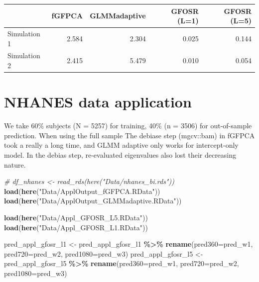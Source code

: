 \documentclass[
]{article}
\newenvironment{Shaded}{\begin{snugshade}}{\end{snugshade}}
\newcommand{\AttributeTok}[1]{\textcolor[rgb]{0.13,0.29,0.53}{#1}}
\newcommand{\CommentTok}[1]{\textcolor[rgb]{0.56,0.35,0.01}{\textit{#1}}}
\newcommand{\FunctionTok}[1]{\textcolor[rgb]{0.13,0.29,0.53}{\textbf{#1}}}
\newcommand{\NormalTok}[1]{#1}
\newcommand{\OtherTok}[1]{\textcolor[rgb]{0.56,0.35,0.01}{#1}}
\newcommand{\SpecialCharTok}[1]{\textcolor[rgb]{0.81,0.36,0.00}{\textbf{#1}}}
\newcommand{\StringTok}[1]{\textcolor[rgb]{0.31,0.60,0.02}{#1}}
\begin{document}
\begin{longtable}[t]{lrrrr}
\toprule
 & fGFPCA & GLMMadaptive & GFOSR (L=1) & GFOSR (L=5)\\
\midrule
Simulation 1 & 2.584 & 2.304 & 0.025 & 0.144\\
Simulation 2 & 2.415 & 5.479 & 0.010 & 0.054\\
\bottomrule
\end{longtable}

\section{NHANES data application}\label{nhanes-data-application}

We take 60\% subjects (N = 5257) for training, 40\% (n = 3506) for
out-of-sample prediction. When using the full sample The debiase step
(mgcv::bam) in fGFPCA took a really a long time, and GLMM adaptive only
works for intercept-only model. In the debias step, re-evaluated
eigenvalues also lost their decreasing nature.

\begin{Shaded}
\begin{Highlighting}[]
\CommentTok{\# df\_nhanes \textless{}{-} read\_rds(here("Data/nhanes\_bi.rds"))}
\FunctionTok{load}\NormalTok{(}\FunctionTok{here}\NormalTok{(}\StringTok{"Data/ApplOutput\_fGFPCA.RData"}\NormalTok{))}
\FunctionTok{load}\NormalTok{(}\FunctionTok{here}\NormalTok{(}\StringTok{"Data/ApplOutput\_GLMMadaptive.RData"}\NormalTok{))}

\FunctionTok{load}\NormalTok{(}\FunctionTok{here}\NormalTok{(}\StringTok{"Data/Appl\_GFOSR\_L5.RData"}\NormalTok{))}
\FunctionTok{load}\NormalTok{(}\FunctionTok{here}\NormalTok{(}\StringTok{"Data/Appl\_GFOSR\_L1.RData"}\NormalTok{))}

\NormalTok{pred\_appl\_gfosr\_l1 }\OtherTok{\textless{}{-}}\NormalTok{ pred\_appl\_gfosr\_l1 }\SpecialCharTok{\%\textgreater{}\%}
  \FunctionTok{rename}\NormalTok{(}\AttributeTok{pred360=}\NormalTok{pred\_w1, }\AttributeTok{pred720=}\NormalTok{pred\_w2, }\AttributeTok{pred1080=}\NormalTok{pred\_w3)}
\NormalTok{pred\_appl\_gfosr\_l5 }\OtherTok{\textless{}{-}}\NormalTok{ pred\_appl\_gfosr\_l5 }\SpecialCharTok{\%\textgreater{}\%}
  \FunctionTok{rename}\NormalTok{(}\AttributeTok{pred360=}\NormalTok{pred\_w1, }\AttributeTok{pred720=}\NormalTok{pred\_w2, }\AttributeTok{pred1080=}\NormalTok{pred\_w3)}
\end{Highlighting}
\end{Shaded}
\end{document}
